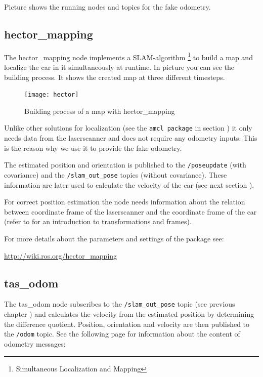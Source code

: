Picture  shows the running nodes and topics for the fake odometry.

\subsection{hector\_mapping}
\label{sec:tas_package_odom_hector}

The hector\_mapping node implements a SLAM-algorithm \footnote{Simultaneous Localization and Mapping} to build a map and localize the car in it simultaneously at runtime. In picture  you can see the building process. It shows the created map at three different timesteps.

\begin{figure}[h]
	\centering
		\texttt{[image: hector]}
	\caption{Building process of a map with hector\_mapping}
	\label{fig:hector_buidling_process}
\end{figure}

Unlike other solutions for localization (see the \texttt{amcl package} in section ) it only needs data from the laserscanner and does not require any odometry inputs. This is the reason why we use it to provide the fake odometry.

The estimated position and orientation is published to the \texttt{/poseupdate} (with covariance) and the \texttt{/slam\_out\_pose} topics (without covariance). These information are later used to calculate the velocity of the car (see next section ).
 
For correct position estimation the node needs information about the relation between coordinate frame of the laserscanner and the coordinate frame of the car (refer to  for an introduction to transformations and frames). 

For more details about the parameters and settings of the package see:

\hyperref[http://wiki.ros.org/hector_mapping]{http://wiki.ros.org/hector\_mapping}

\subsection{tas\_odom}
\label{sec:tas_package_odom_node}
The tas\_odom node subscribes to the \texttt{/slam\_out\_pose} topic (see previous chapter ) and calculates the velocity from the estimated position by determining the difference quotient. Position, orientation and velocity are then published to the \texttt{/odom} topic. See the following page for information about the content of odometry messages:


